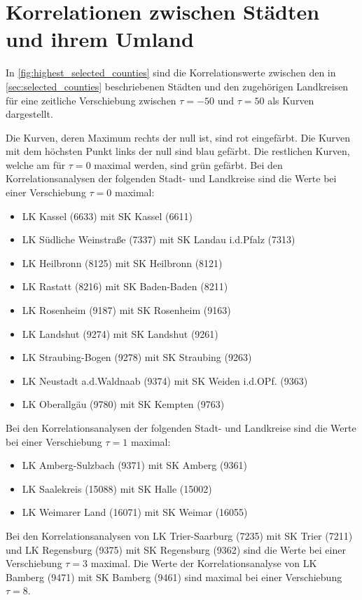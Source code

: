\section{Korrelationen zwischen Städten und ihrem Umland}
In \autoref{fig:highest_selected_counties} sind die Korrelationswerte zwischen den in  \autoref{sec:selected_counties} beschriebenen Städten und den zugehörigen Landkreisen für eine zeitliche Verschiebung zwischen $\tau=-50$ und $\tau=50$ als Kurven dargestellt.

Die Kurven, deren Maximum rechts der null ist, sind rot eingefärbt. Die Kurven mit dem höchsten Punkt links der null sind blau gefärbt. Die restlichen Kurven, welche am für $\tau=0$ maximal werden, sind grün gefärbt.
Bei den Korrelationsanalysen der folgenden Stadt- und Landkreise sind die Werte bei einer Verschiebung $\tau=0$ maximal:
\begin{itemize}
    \item LK Kassel (6633) mit SK Kassel (6611)
    \item LK Südliche Weinstraße (7337) mit SK Landau i.d.Pfalz (7313)
    \item LK Heilbronn (8125) mit SK Heilbronn (8121)
    \item LK Rastatt (8216) mit SK Baden-Baden (8211)
    \item LK Rosenheim (9187) mit SK Rosenheim (9163)
    \item LK Landshut (9274) mit SK Landshut (9261)
    \item LK Straubing-Bogen (9278) mit SK Straubing (9263)
    \item LK Neustadt a.d.Waldnaab (9374) mit SK Weiden i.d.OPf. (9363)
    \item LK Oberallgäu (9780) mit SK Kempten (9763)
\end{itemize}
Bei den Korrelationsanalysen der folgenden Stadt- und Landkreise sind die Werte bei einer Verschiebung $\tau=1$ maximal:
\begin{itemize}
    \item LK Amberg-Sulzbach (9371) mit SK Amberg (9361)
    \item LK Saalekreis (15088) mit SK Halle (15002)
    \item LK Weimarer Land (16071) mit SK Weimar (16055)
\end{itemize}
Bei den Korrelationsanalysen von LK Trier-Saarburg (7235) mit SK Trier (7211) und LK Regensburg (9375) mit SK Regensburg (9362) sind die Werte bei einer Verschiebung $\tau=3$ maximal. Die Werte der Korrelationsanalyse von LK Bamberg (9471) mit SK Bamberg (9461) sind maximal bei einer Verschiebung $\tau=8$.
